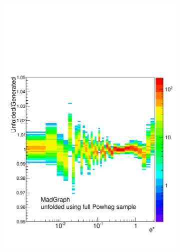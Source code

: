 \begin{figure}[!htbp]
\begin{subfigure}[b]{\SideBySidePlotWidth}
        \includegraphics[width=\textwidth]{figures/ToyMC_PM_ALL.pdf}
        \caption{}
        \label{fig:toy_mc_all}
    \end{subfigure}%
    \begin{subfigure}[b]{\SideBySidePlotWidth}

\end{subfigure}
\end{figure}
